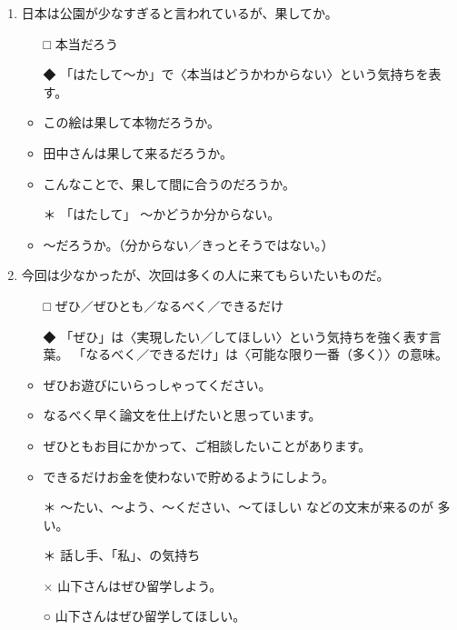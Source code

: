 \documentclass[
uplatex,
b5paper,
10pt,
dvipdfmx
]{jsbook}
\begin{document}
\begin{enumerate}
\item 日本は公園が少なすぎると言われているが、果して\underline{\hspace{3zw}}か。
\begin{itemize}
\item[□] 本当だろう
\item[◆] 「はたして〜か」で〈本当はどうかわからない〉という気持ちを表す。
\end{itemize}
\begin{itemize}
 \item この絵は果して本物だろうか。
 \item 田中さんは果して来るだろうか。
 \item こんなことで、果して間に合うのだろうか。  
\end{itemize}
\begin{itemize}
 \item[＊] 「はたして」 〜かどうか分からない。
 \item          〜だろうか。（分からない／きっとそうではない。）
\end{itemize}

\item 今回は少なかったが、次回は\underline{\hspace{3zw}}多くの人に来てもらいたいものだ。
\begin{itemize}
\item[□] ぜひ／ぜひとも／なるべく／できるだけ
\item[◆] 「ぜひ」は〈実現したい／してほしい〉という気持ちを強く表す言葉。
	  「なるべく／できるだけ」は〈可能な限り一番（多く）〉の意味。
\end{itemize}
\begin{itemize}
 \item ぜひお遊びにいらっしゃってください。
 \item なるべく早く論文を仕上げたいと思っています。
 \item ぜひともお目にかかって、ご相談したいことがあります。
 \item できるだけお金を使わないで貯めるようにしよう。
 \item[＊] 〜たい、〜よう、〜ください、〜てほしい などの文末が来るのが
	   多い。
 \item[＊] 話し手、「私」、の気持ち
 \item[×] 山下さんはぜひ留学しよう。
 \item[○] 山下さんはぜひ留学してほしい。
\end{itemize}


\end{enumerate}
\end{document}
